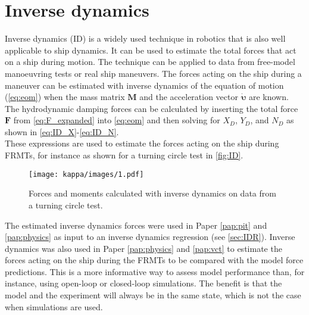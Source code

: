 \section{Inverse dynamics} \label{sec:ID}
Inverse dynamics (ID) is a widely used technique in robotics \cite{faberInverseDynamicsMechanical2018, haningerNonparametricInverseDynamic2019, mastalliInverseDynamicsMPCNullspace2023, sunHighorderInverseDynamics2023, kurtzInverseDynamicsTrajectory2023} that is also well applicable to ship dynamics. It can be used to estimate the total forces that act on a ship during motion. The technique can be applied to data from free-model manoeuvring tests or real ship maneuvers. The forces acting on the ship during a maneuver can be estimated with inverse dynamics of the equation of motion (\autoref{eq:eom}) when the mass matrix $\mathbf{M}$ and the acceleration vector $\pmb{\bm{\dot{\upsilon}}}$ are known. The hydrodynamic damping forces can be calculated by inserting the total force $\mathbf{F}$ from \autoref{eq:F_expanded} into \autoref{eq:eom} and then solving for $X_D$, $Y_D$, and $N_D$ as shown in \autoref{eq:ID_X}-\autoref{eq:ID_N}.
\begin{equation}
    \label{eq:ID_X}
    
\end{equation}
\begin{equation}
    \label{eq:ID_Y}
    
\end{equation}
\begin{equation}
    \label{eq:ID_N}
    
\end{equation}
These expressions are used to estimate the forces acting on the ship during FRMTs, for instance as shown for a turning circle test in \autoref{fig:ID}.
\begin{figure}[H]
    \centering
    \texttt{[image: kappa/images/1.pdf]}
    \caption{Forces and moments calculated with inverse dynamics on data from a turning circle test.}
    \label{fig:ID}
\end{figure}

The estimated inverse dynamics forces were used in Paper \ref{pap:pit} and \ref{pap:physics} as input to an inverse dynamics regression (see \autoref{sec:IDR}). 
Inverse dynamics was also used in Paper \ref{pap:physics} and \ref{pap:vct} to estimate the forces acting on the ship during the FRMTs to be compared with the model force predictions. This is a more informative way to assess model performance than, for instance, using open-loop or closed-loop simulations. The benefit is that the model and the experiment will always be in the same state, which is not the case when simulations are used.